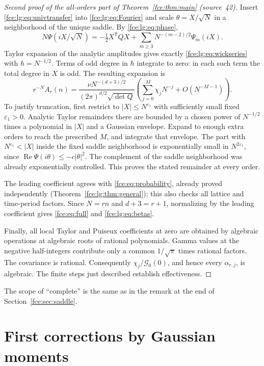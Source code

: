\documentclass[11pt,a4paper]{article}
\numberwithin{equation}{section}
\theoremstyle{definition}\newtheorem{definition}[theorem]{Definition}
\theoremstyle{remark}\newtheorem{remark}[theorem]{Remark}
\DeclareMathOperator{\Rea}{Re}
\begin{document}
\begin{proof}[Second proof of the all-orders part of Theorem~\ref{fce:thm:main} (source~42)]
Insert \eqref{fce:lg:eq:univtransfer} into \eqref{fce:lg:eq:Fourier} and
scale $\theta=X/\sqrt N$ in a neighborhood of the unique saddle. By
\eqref{fce:lg:eq:phase},
\[
 N\Psi(iX/\sqrt N)
 =-\tfrac12X^{\mathsf T}QX+
 \sum_{m\ge3}N^{-(m-2)/2}\Psi_m(iX).
\]
Taylor expansion of the analytic amplitudes gives exactly
\eqref{fce:lg:eq:wickseries} with $\hbar=N^{-1/2}$. Terms of odd degree in
$\hbar$ integrate to zero: in each such term the total degree in $X$ is
odd. The resulting expansion is
\[
 r^{-N}A_r(n)=
 \frac{\nu N^{-(d+3)/2}}{(2\pi)^{d/2}\sqrt{\det Q}}
 \left(\sum_{j=0}^M\chi_jN^{-j}+O(N^{-M-1})\right).
\]
To justify truncation, first restrict to $|X|\le N^{\varepsilon_1}$ with
sufficiently small fixed $\varepsilon_1>0$. Analytic Taylor remainders there
are bounded by a chosen power of $N^{-1/2}$ times a polynomial in $|X|$ and
a Gaussian envelope. Expand to enough extra orders to reach the prescribed
$M$, and integrate that envelope. The part with $N^{\varepsilon_1}<|X|$
inside the fixed saddle neighborhood is exponentially small in
$N^{2\varepsilon_1}$, since $\Rea\Psi(i\theta)\le-c|\theta|^2$. The
complement of the saddle neighborhood was already exponentially
controlled. This proves the stated remainder at every order.

The leading coefficient agrees with \eqref{fce:eq:probability}, already
proved independently (Theorem~\ref{fce:lg:thm:general}); this also checks
all lattice and time-period factors. Since $N=rn$ and $d+3=r+1$,
normalizing by the leading coefficient gives \eqref{fce:eq:full} and
\eqref{fce:lg:eq:betas}.

Finally, all local Taylor and Puiseux coefficients at zero are obtained by
algebraic operations at algebraic roots of rational polynomials. Gamma
values at the negative half-integers contribute only a common $1/\sqrt\pi$
times rational factors. The covariance is rational. Consequently
$\chi_j/\mathcal G_0(0)$, and hence every $\alpha_{r,j}$, is algebraic.
The finite steps just described establish effectiveness.
\end{proof}
The scope of ``complete'' is the same as in the remark at the end of
Section~\ref{fce:sec:saddle}.

\section{First corrections by Gaussian moments}\label{fce:lg:sec:first}
\end{document}
